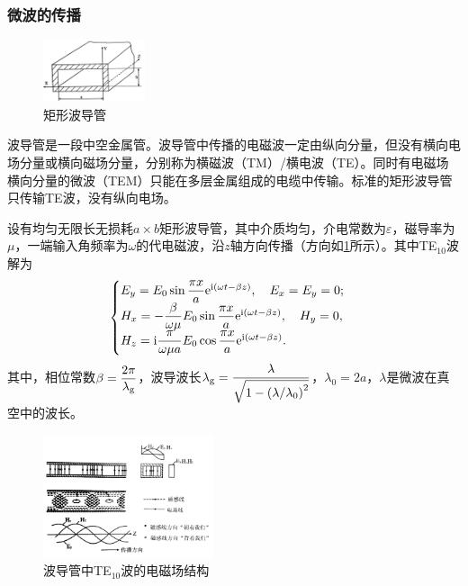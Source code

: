 	\subsubsection{微波的传播} %
		\label{ssub:微波的传播}
		\FloatBarrier
		\begin{figure}
			\includegraphics[width=3cm]{fig/scan/Rectangularwaveguide.png}
			\caption{矩形波导管}\label{fig:矩形波导管}
		\end{figure}
		\FloatBarrier
		\par 波导管是一段中空金属管。波导管中传播的电磁波一定由纵向分量，但没有横向电场分量或横向磁场分量，分别称为横磁波（TM）/横电波（TE）。同时有电磁场横向分量的微波（TEM）只能在多层金属组成的电缆中传输。标准的矩形波导管只传输TE波，没有纵向电场。
		\par 设有均匀无限长无损耗$a\times b$矩形波导管，其中介质均匀，介电常数为$\varepsilon$，磁导率为$\mu$，一端输入角频率为$\omega$的代电磁波，沿$z$轴方向传播（方向如\cref{fig:矩形波导管}所示）。其中TE$_{10}$波解为
		\begin{equation}
			\begin{cases}
				E_y=E_0\sin{\dfrac{\pi x}{a}}{\rm e}^{{\rm i}(\omega t-\beta z)},\quad E_x=E_y=0;\\
				H_x=-\dfrac{\beta}{\omega\mu}E_0\sin{\dfrac{\pi x}{a}}{\rm e}^{{\rm i}(\omega t-\beta z)},\quad H_y=0,\\
				H_z={\rm i}\dfrac{\pi}{\omega\mu a}E_0\cos{\dfrac{\pi x}{a}}{\rm e}^{{\rm i}(\omega t-\beta z)}.
			\end{cases}\label{eq:emwave}
		\end{equation}
		其中，相位常数$\beta =\dfrac{2\pi}{\lambda_{\rm g}}$，波导波长$\lambda_{\rm g}=\dfrac{\lambda}{\sqrt{1-\left(\lambda /\lambda_0\right)^2}}$，$\lambda_0 = 2a$，$\lambda$是微波在真空中的波长。
		\begin{figure}
			\includegraphics[width=5cm]{fig/scan/StructureoftheEMFieldofTE10Wave.png}
			\caption{波导管中TE$_{10}$波的电磁场结构}\label{fig:波导管中TE10波的电磁场结构}
		\end{figure}
